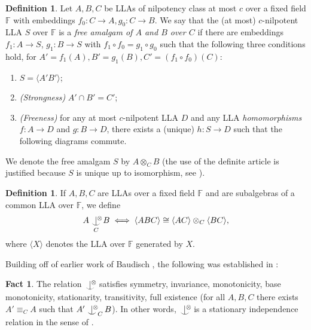 \documentclass[psamsfonts]{amsart}
\theoremstyle{definition}
\newtheorem{fact}[thm]{Fact}
\theoremstyle{definition}
\newtheorem{definition}[thm]{Definition}
\theoremstyle{remark}
\numberwithin{equation}{section}
\newcommand{\vect}[1]{\langle {#1} \rangle}
\def\indi#1{\mathop{\ \ \hbox to 0ex{\hss$\vert^{\hbox to 0ex{$\scriptstyle#1$\hss}}$\hss}
\lower1ex\hbox to 0ex{\hss$\smile$\hss}\ \ }}
\begin{document}
\begin{definition} \label{def:freeamalgambaudisch}
    Let $A,B,C$ be LLAs of nilpotency class at most $c$ over a fixed field $\mathbb{F}$ with embeddings $f_0 :C\to A, g_0:C\to B$. We say that the (at most) $c$-nilpotent LLA $S$ over $\mathbb{F}$ is a \textit{free amalgam of $A$ and $B$ over $C$} if there are embeddings $f_1:A\to S$, $g_1:B\to S$ with $f_1\circ f_0 = g_1\circ g_0$ such that the following three conditions hold, for $A' = f_1(A), B' = g_1(B), C' = (f_1\circ f_0)(C)$:
    \begin{enumerate}
        \item $S = \vect{A'B'}$;
        \item \textit{(Strongness)} $A'\cap B' = C'$;
        \item \textit{(Freeness)} for any at most $c$-nilpotent LLA $D$ and any LLA \textit{homomorphisms} $f:A\to D$ and $g:B\to D$, there exists a (unique) $h : S\to D$ such that the following diagrams commute. 
        \begin{center}\end{center}
    \end{enumerate}
    We denote the free amalgam $S$ by $A\otimes_C B$ (the use of the definite article is justified because $S$ is unique up to isomorphism, see \cite[Remarks 4.15 and 4.16]{d2023model}).
\end{definition}

\begin{definition}
    If $A,B,C$ are LLAs over a fixed field $\mathbb{F}$ and are subalgebras of a common LLA over $\mathbb{F}$, we define
    \[A\indi \otimes _C B\iff \vect{ABC}\cong \vect{AC}\otimes_C \vect{BC},\] where $\langle X \rangle$ denotes the LLA over $\mathbb{F}$ generated by $X$.  
\end{definition}

Building off of earlier work of Baudisch \cite{Baudisch4}, the following was established in \cite{d2023model}:

\begin{fact}\label{fact:basicpropertiesoffreeindependence} \cite[Proposition 4.22, Corollary 4.40]{d2023model}
    The relation $\indi \otimes$ satisfies symmetry, invariance, monotonicity, base monotonicity, stationarity, transitivity, full existence (for all $A,B,C$ there exists $A'\equiv_C A $ such that $A'\indi \otimes _C B$). In other words, $\indi \otimes$ is a stationary independence relation in the sense of \cite{tentzieglerurysohn}.
\end{fact}
\end{document}
